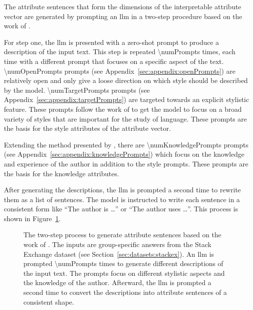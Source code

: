The attribute sentences that form the dimensions of the interpretable attribute vector are generated by prompting an \acf{llm} in a two-step procedure based on the work of \citet{patelLearningInterpretableStyle2023}.

For step one, the \ac{llm} is presented with a zero-shot prompt to produce a description of the input text. This step is repeated \num{\numPrompts} times, each time with a different prompt that focuses on a specific aspect of the text. \num{\numOpenPrompts} prompts (see Appendix~\ref{sec:appendix:openPrompts}) are relatively open and only give a loose direction on which style should be described by the model. \num{\numTargetPrompts} prompts (see Appendix~\ref{sec:appendix:targetPrompts}) are targeted towards an explicit stylistic feature. These prompts follow the work of \citet{patelLearningInterpretableStyle2023,tausczikPsychologicalMeaningWords2010} to get the model to focus on a broad variety of styles that are important for the study of language. These prompts are the basis for the style attributes of the attribute vector.

Extending the method presented by \citet{patelLearningInterpretableStyle2023}, there are \num{\numKnowledgePrompts} prompts (see Appendix~\ref{sec:appendix:knowledgePrompts}) which focus on the knowledge and experience of the author in addition to the style prompts. These prompts are the basis for the knowledge attributes.

After generating the descriptions, the \ac{llm} is prompted a second time to rewrite them as a list of sentences. The model is instructed to write each sentence in a consistent form like \enquote{The author is \ldots} or \enquote{The author uses \ldots}. This process is shown in Figure~\ref{fig:attributeSentenceGeneration}.

\begin{figure}[ht]
  
  \caption{The two-step process to generate attribute sentences based on the work of \citet{patelLearningInterpretableStyle2023}. The inputs are group-specific answers from the Stack Exchange dataset (see Section~\ref{sec:datasets:stackex}). An \acs{llm} is prompted \num{\numPrompts} times to generate different descriptions of the input text. The prompts focus on different stylistic aspects and the knowledge of the author. Afterward, the \acs{llm} is prompted a second time to convert the descriptions into attribute sentences of a consistent shape.}
  \label{fig:attributeSentenceGeneration}
\end{figure}

